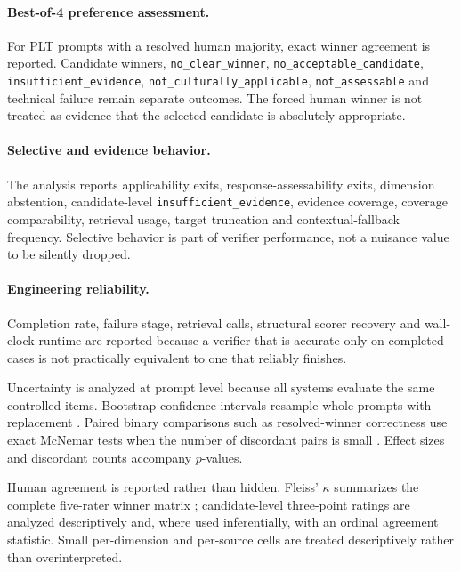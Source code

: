 \paragraph{Best-of-4 preference assessment.}
For PLT prompts with a resolved human majority, exact winner agreement is reported. Candidate winners, \texttt{no\_clear\_winner}, \texttt{no\_acceptable\_candidate}, \texttt{insufficient\_evidence}, \texttt{not\_culturally\_applicable}, \texttt{not\_assessable} and technical failure remain separate outcomes. The forced human winner is not treated as evidence that the selected candidate is absolutely appropriate.

\paragraph{Selective and evidence behavior.}
The analysis reports applicability exits, response-assessability exits, dimension abstention, candidate-level \texttt{insufficient\_evidence}, evidence coverage, coverage comparability, retrieval usage, target truncation and contextual-fallback frequency. Selective behavior is part of verifier performance, not a nuisance value to be silently dropped.

\paragraph{Engineering reliability.}
Completion rate, failure stage, retrieval calls, structural scorer recovery and wall-clock runtime are reported because a verifier that is accurate only on completed cases is not practically equivalent to one that reliably finishes.

Uncertainty is analyzed at prompt level because all systems evaluate the same controlled items. Bootstrap confidence intervals resample whole prompts with replacement \parencite{efron1993bootstrap}. Paired binary comparisons such as resolved-winner correctness use exact McNemar tests when the number of discordant pairs is small \parencite{mcnemar1947correlated}. Effect sizes and discordant counts accompany $p$-values.

Human agreement is reported rather than hidden. Fleiss' $\kappa$ summarizes the complete five-rater winner matrix \parencite{fleiss1971kappa}; candidate-level three-point ratings are analyzed descriptively and, where used inferentially, with an ordinal agreement statistic. Small per-dimension and per-source cells are treated descriptively rather than overinterpreted.

